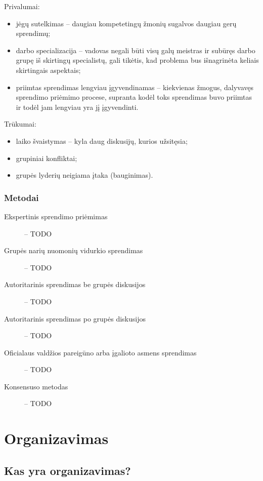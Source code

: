 Privalumai:
\begin{itemize}
  \item jėgų sutelkimas – daugiau kompetetingų žmonių sugalvos daugiau
    gerų sprendimų;
  \item darbo specializacija – vadovas negali būti visų galų meistras
    ir subūręs darbo grupę iš skirtingų specialistų, gali tikėtis,
    kad problema bus išnagrinėta keliais skirtingais aspektais;
  \item priimtas sprendimas lengviau įgyvendinamas – kiekvienas žmogus,
    dalyvavęs sprendimo priėmimo procese, supranta kodėl toks sprendimas
    buvo priimtas ir todėl jam lengviau yra jį įgyvendinti.
\end{itemize}

Trūkumai:
\begin{itemize}
  \item laiko švaistymas – kyla daug diskusijų, kurios užsitęsia;
  \item grupiniai konfliktai;
  \item grupės lyderių neigiama įtaka (bauginimas).
\end{itemize}

\subsection{Metodai}

\begin{description}
  \item[Ekspertinis sprendimo priėmimas] – TODO
  \item[Grupės narių nuomonių vidurkio sprendimas] – TODO
  \item[Autoritarinis sprendimas be grupės diskusijos] – TODO
  \item[Autoritarinis sprendimas po grupės diskusijos] – TODO
  \item[Oficialaus valdžios pareigūno arba įgalioto asmens sprendimas] –
    TODO
  \item[Konsensuso metodas] – TODO
\end{description}

\chapter{Organizavimas}

\section{Kas yra organizavimas?}

